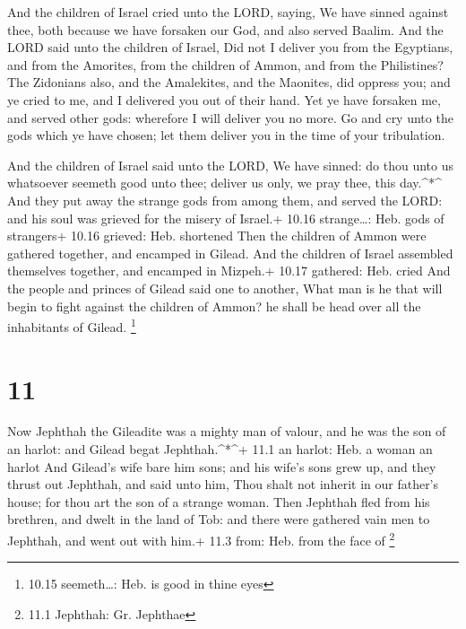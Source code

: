  And the children of Israel cried unto the LORD, saying, We
have sinned against thee, both because we have forsaken our God, and
also served Baalim.  And the LORD said unto the children of
Israel, Did not I deliver you from the Egyptians, and from the Amorites,
from the children of Ammon, and from the Philistines?  The
Zidonians also, and the Amalekites, and the Maonites, did oppress you;
and ye cried to me, and I delivered you out of their hand. 
Yet ye have forsaken me, and served other gods: wherefore I will deliver
you no more.  Go and cry unto the gods which ye have
chosen; let them deliver you in the time of your tribulation.

 And the children of Israel said unto the LORD, We have
sinned: do thou unto us whatsoever seemeth good unto thee; deliver us
only, we pray thee, this day.\^{}*\^{}  And they put away
the strange gods from among them, and served the LORD: and his soul was
grieved for the misery of Israel.+ 10.16 strange\ldots: Heb. gods of
strangers+ 10.16 grieved: Heb. shortened  Then the children
of Ammon were gathered together, and encamped in Gilead. And the
children of Israel assembled themselves together, and encamped in
Mizpeh.+ 10.17 gathered: Heb. cried  And the people and
princes of Gilead said one to another, What man is he that will begin to
fight against the children of Ammon? he shall be head over all the
inhabitants of Gilead. \footnote{10.15 seemeth\ldots: Heb. is good in
  thine eyes}

\hypertarget{section-10}{%
\section{11}\label{section-10}}

 Now Jephthah the Gileadite was a mighty man of valour, and
he was the son of an harlot: and Gilead begat Jephthah.\^{}*\^{}+ 11.1
an harlot: Heb. a woman an harlot  And Gilead's wife bare
him sons; and his wife's sons grew up, and they thrust out Jephthah, and
said unto him, Thou shalt not inherit in our father's house; for thou
art the son of a strange woman.  Then Jephthah fled from his
brethren, and dwelt in the land of Tob: and there were gathered vain men
to Jephthah, and went out with him.+ 11.3 from: Heb. from the face of
\footnote{11.1 Jephthah: Gr. Jephthae}

